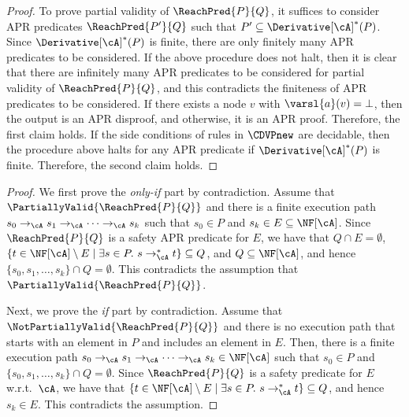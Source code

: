 \begin{proof}
	To prove partial validity of $\ReachPred{P}{Q}$, it suffices to consider APR predicates $\ReachPred{P'}{Q}$ such that $P' \subseteq \Derivative[\cA]^*(P)$.
	Since $\Derivative[\cA]^*(P)$ is finite, there are only finitely many APR predicates to be considered.
	If the above procedure does not halt, then it is clear that there are infinitely many APR predicates to be considered for partial validity of $\ReachPred{P}{Q}$, and this contradicts the finiteness of APR predicates to be considered.
	If there exists a node $v$ with $\varsl{a}(v) = \bot$, then the output is an APR disproof, and otherwise, it is an APR proof.
	Therefore, the first claim holds.
	If the side conditions of rules in $\CDVPnew$ are decidable, then the procedure above halts for any APR predicate if $\Derivative[\cA]^*(P)$ is finite.
	Therefore,
	the second claim holds.
\end{proof}

\ThmPartiallyValidSafetyProperties*
\begin{proof}
	We
	first
	prove the \textit{only-if} part by contradiction.
	Assume that $\PartiallyValid{\ReachPred{P}{Q}}$ and there is a finite execution path $s_0 \to_\cA s_1 \to_\cA \cdots \to_\cA s_k$
	such that $s_0 \in P$ and $s_k \in E \subseteq \NF[\cA]$.
	Since $\ReachPred{P}{Q}$ is a safety APR predicate for $E$, we have that $Q \cap E = \emptyset$, $\{ t \in \NF[\cA] \setminus E \mid \exists s \in P.\ s \to_\cA^* t \} \subseteq Q$, and $Q \subseteq \NF[\cA]$, and hence
	$\{s_0,s_1,\ldots,s_k\} \cap Q = \emptyset$.
	This contradicts the assumption that $\PartiallyValid{\ReachPred{P}{Q}}$.

	Next, we prove the \textit{if} part by contradiction.
	Assume that
	$\NotPartiallyValid{\ReachPred{P}{Q}}$
	and there is no execution path that starts with an element in $P$ and includes an element in $E$.
	Then,
	there is a finite execution path $s_0 \to_\cA s_1 \to_\cA \cdots \to_\cA s_k \in \NF[\cA]$ such that
	$s_0 \in P$ and
	$\{s_0,s_1,\ldots,s_k\} \cap Q = \emptyset$.
	Since $\ReachPred{P}{Q}$ is a safety predicate for $E$ w.r.t.\ $\cA$, we have that $\{ t \in \NF[\cA] \setminus E \mid \exists s \in P.\ s \to_\cA^* t \} \subseteq Q$, and hence $s_k \in E$.
	This contradicts the assumption.
\end{proof}

